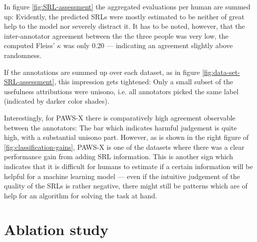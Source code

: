 {In figure \ref{fig:SRL-assessment} the aggregated evaluations per human are summed up:
Evidently, the predicted SRLs were mostly estimated to be neither of great help to the model
nor severely distract it. It has to be noted, however, that the inter-annotator agreement between
the the three people was very low, the computed Fleiss' $\kappa$ was only 0.20 --- indicating
an agreement slightly above randomness.

If the annotations are summed up over each dataset, as in figure \ref{fig:data-set-SRL-assessment},
this impression gets tightened: Only a small subset of the usefulness attributions were unisono,
i.e. all annotators picked the same label (indicated by darker color shades).


Interestingly, for PAWS-X there is comparatively high agreement observable between the annotators:
The bar which indicates harmful judgement is quite high, with a substantial unisono part. However,
as is shown in the right figure of \ref{fig:classification-gains}, PAWS-X is one of the datasets
where there was a clear performance gain from adding SRL information. This is another sign which
indicates that it is difficult for humans to estimate if a certain information will be helpful for
a machine learning model --- even if the intuitive judgement of the quality of the SRLs is rather
negative, there might still be patterns which are of help for an algorithm for solving the task at
hand.














\section{Ablation study}
\label{sec:ablation}

}
